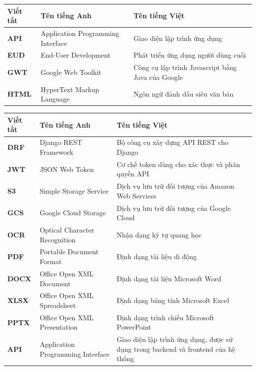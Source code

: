 \documentclass[../DoAn.tex]{subfiles}
\begin{document}
\begin{longtable}{l p{6cm} p{7cm}}
	\hline
   \textbf{Viết tắt}  & \textbf{Tên tiếng Anh}	& \textbf{Tên tiếng Việt} \\ \hline 
	\textbf{API} & Application Programming Interface & Giao diện lập trình ứng dụng\\
	\textbf{EUD} & End-User Development & Phát triển ứng dụng người dùng cuối\\
	\textbf{GWT} & Google Web Toolkit & Công cụ lập trình Javascript bằng Java của Google\\
	\textbf{HTML} & HyperText Markup Language & Ngôn ngữ đánh dấu siêu văn bản\\
    \hline
\end{longtable}

\begin{longtable}{l p{6cm} p{7cm}}
    \hline
   \textbf{Viết tắt}  & \textbf{Tên tiếng Anh} & \textbf{Tên tiếng Việt} \\ \hline
    \textbf{DRF} & Django REST Framework & Bộ công cụ xây dựng API REST cho Django \\
    \textbf{JWT} & JSON Web Token & Cơ chế token dùng cho xác thực và phân quyền API \\
    \textbf{S3} & Simple Storage Service & Dịch vụ lưu trữ đối tượng của Amazon Web Services \\
    \textbf{GCS} & Google Cloud Storage & Dịch vụ lưu trữ đối tượng của Google Cloud \\
    \textbf{OCR} & Optical Character Recognition & Nhận dạng ký tự quang học \\
    \textbf{PDF} & Portable Document Format & Định dạng tài liệu di động \\
    \textbf{DOCX} & Office Open XML Document & Định dạng tài liệu Microsoft Word \\
    \textbf{XLSX} & Office Open XML Spreadsheet & Định dạng bảng tính Microsoft Excel \\
    \textbf{PPTX} & Office Open XML Presentation & Định dạng trình chiếu Microsoft PowerPoint \\
    \textbf{API} & Application Programming Interface & Giao diện lập trình ứng dụng, được sử dụng trong backend và frontend của hệ thống \\
    \hline
\end{longtable}
\end{document}
